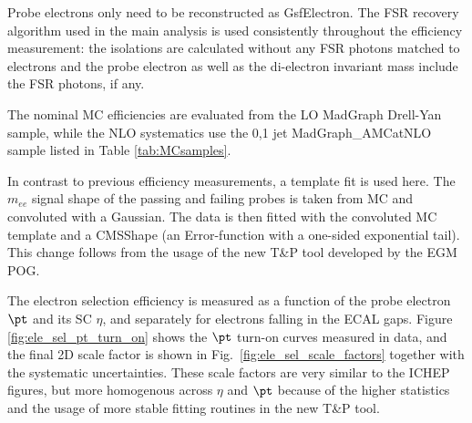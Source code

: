Probe electrons only need to be reconstructed as GsfElectron. The FSR recovery algorithm used in the main analysis is used consistently throughout the efficiency measurement: the isolations are calculated without any FSR photons matched to electrons and the probe electron \pt as well as the di-electron invariant mass include the FSR photons, if any. 


The nominal MC efficiencies are evaluated from the LO MadGraph Drell-Yan sample, while the NLO systematics use the 0,1 jet MadGraph\_AMCatNLO sample listed in Table \ref{tab:MCsamples}.

In contrast to previous efficiency measurements, a template fit is used here. The $m_{ee}$ signal shape of the passing and failing probes is taken from MC and convoluted with a Gaussian. The data is then fitted with the convoluted MC template and a CMSShape (an Error-function with a one-sided exponential tail). This change follows from the usage of the new T\&P tool developed by the EGM POG.



The electron selection efficiency is measured as a function of the probe electron $\pt$ and its SC $\eta$, and separately for electrons falling in the ECAL gaps. Figure \ref{fig:ele_sel_pt_turn_on} shows the $\pt$ turn-on curves measured in data, and the final 2D scale factor is shown in Fig.~\ref{fig:ele_sel_scale_factors} together with the systematic uncertainties. These scale factors are very similar to the ICHEP figures, but more homogenous across $\eta$ and $\pt$ because of the higher statistics and the usage of more stable fitting routines in the new T\&P tool.



